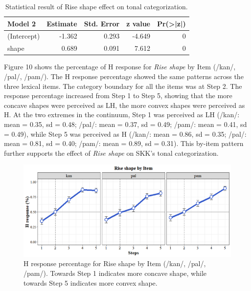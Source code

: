 \documentclass[
  man,floatsintext]{apa6}
\begin{document}
\begin{table}[H]

\caption{\label{tab:table3}Statistical result of Rise shape effect on tonal categorization.}
\centering
\begin{tabular}[t]{l|r|r|r|r}
\hline
Model 2 & Estimate & Std. Error & z value & Pr(>|z|)\\
\hline
(Intercept) & -1.362 & 0.293 & -4.649 & 0\\
\hline
shape & 0.689 & 0.091 & 7.612 & 0\\
\hline
\end{tabular}
\end{table}

Figure 10 shows the percentage of H response for \emph{Rise shape} by Item (/kan/, /pal/, /pam/). The H response percentage showed the same patterns across the three lexical items. The category boundary for all the items was at Step 2. The response percentage increased from Step 1 to Step 5, showing that the more concave shapes were perceived as LH, the more convex shapes were perceived as H. At the two extremes in the continuum, Step 1 was perceived as LH (/kan/: mean = 0.35, sd = 0.48; /pal/: mean = 0.37, sd = 0.49; /pam/: mean = 0.41, sd = 0.49), while Step 5 was perceived as H (/kan/: mean = 0.86, sd = 0.35; /pal/: mean = 0.81, sd = 0.40; /pam/: mean = 0.89, sd = 0.31). This by-item pattern further supports the effect of \emph{Rise shape} on SKK's tonal categorization.

\begin{figure}[H]

{\centering \includegraphics[width=1\linewidth]{images/picture10} 

}

\caption{H response percentage for Rise shape by Item (/kan/, /pal/, /pam/). Towards Step 1 indicates more concave shape, while towards Step 5 indicates more convex shape. }\label{fig:picture10}
\end{figure}
\newpage
\end{document}
